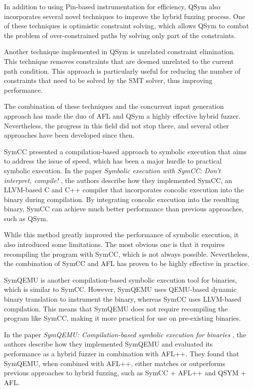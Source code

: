 In addition to using Pin-based instrumentation for efficiency, QSym also incorporates several novel techniques to improve the hybrid fuzzing process. One of these techniques is optimistic constraint solving, which allows QSym to combat the problem of over-constrained paths by solving only part of the constraints.

Another technique implemented in QSym is unrelated constraint elimination. This technique removes constraints that are deemed unrelated to the current path condition. This approach is particularly useful for reducing the number of constraints that need to be solved by the SMT solver, thus improving performance.

The combination of these techniques and the concurrent input generation approach has made the duo of AFL and QSym a highly effective hybrid fuzzer. Nevertheless, the progress in this field did not stop there, and several other approaches have been developed since then.


SymCC presented a compilation-based approach to symbolic execution that aims to address the issue of speed, which has been a major hurdle to practical symbolic execution. In the paper \textit{Symbolic execution with SymCC: Don't interpret, compile!} \cite{symcc-usenix-2020}, the authors describe how they implemented SymCC, an LLVM-based C and C++ compiler that incorporates concolic execution into the binary during compilation. By integrating concolic execution into the resulting binary, SymCC can achieve much better performance than previous approaches, such as QSym.

While this method greatly improved the performance of symbolic execution, it also introduced some limitations. The most obvious one is that it requires recompiling the program with SymCC, which is not always possible. Nevertheless, the combination of SymCC and AFL has proven to be highly effective in practice.


SymQEMU is another compilation-based symbolic execution tool for binaries, which is similar to SymCC. However, SymQEMU uses QEMU-based dynamic binary translation to instrument the binary, whereas SymCC uses LLVM-based compilation. This means that SymQEMU does not require recompiling the program like SymCC, making it more practical for use on pre-existing binaries.

In the paper \textit{SymQEMU: Compilation-based symbolic execution for binaries} \cite{symqemu-ndss-2021}, the authors describe how they implemented SymQEMU and evaluated its performance as a hybrid fuzzer in combination with AFL++. They found that SymQEMU, when combined with AFL++, either matches or outperforms previous approaches to hybrid fuzzing, such as SymCC + AFL++ and QSYM + AFL.

